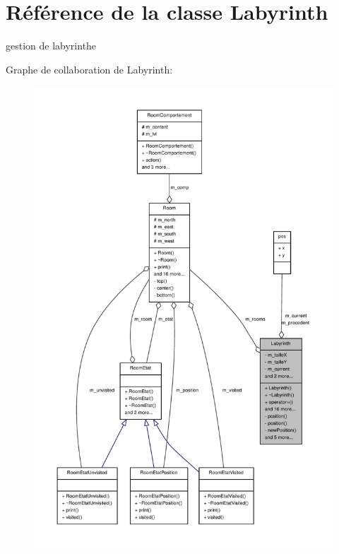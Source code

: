 \hypertarget{class_labyrinth}{\section{Référence de la classe Labyrinth}
\label{class_labyrinth}
}


gestion de labyrinthe  




Graphe de collaboration de Labyrinth\-:
\nopagebreak
\begin{figure}[H]
\begin{center}
\leavevmode
\includegraphics[width=350pt]{class_labyrinth__coll__graph}
\end{center}
\end{figure}
